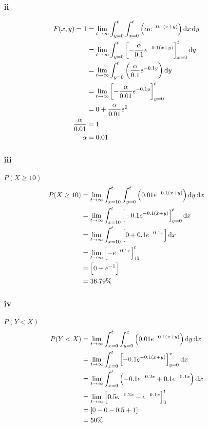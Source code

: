 \documentclass[11pt]{article}
\numberwithin{equation}{section}
\begin{document}
\subsubsection{ii}
\begin{align}
    F(x,y) = 1 &= \lim_{t\rightarrow \infty} \int_{y=0}^{t} \int_{x=0}^{t} \left(\alpha e^{-0.1\left(x+y\right)}\right) \dif x \dif y\\
    &= \lim_{t\rightarrow \infty} \int_{y=0}^{t} \left[ -\frac{\alpha}{0.1} e^{-0.1\left(x+y\right)} \right]_{x=0}^t \dif y\\
    &= \lim_{t\rightarrow \infty} \int_{y=0}^{t} \left(\frac{\alpha}{0.1} e^{-0.1y} \right) \dif y\\
    &= \lim_{t\rightarrow \infty} \left[ -\frac{\alpha}{0.01} e^{-0.1y} \right]_{y=0}^t\\
    &= 0 + \frac{\alpha}{0.01}e^{0}\\
    \frac{\alpha}{0.01} &= 1\\
    \alpha &= 0.01
\end{align}
\subsubsection{iii}
$P(X \geq 10)$
\begin{align}
    P(X \geq 10) &= \lim_{t\rightarrow \infty} \int_{x=10}^{t} \int_{y=0}^{t} \left(0.01 e^{-0.1\left(x + y\right)}\right) \dif y \dif x\\
    &= \lim_{t\rightarrow \infty} \int_{x=10}^{t} \left[-0.1 e^{-0.1\left(x + y\right)}\right]_{y=0}^t \dif x\\
    &= \lim_{t\rightarrow \infty} \int_{x=10}^{t} \left[0+0.1 e^{-0.1x}\right] \dif x\\
    &= \lim_{t\rightarrow \infty} \left[- e^{-0.1x}\right]_{10}^t\\
    &= \left[0 + e^{-1}\right]\\
    &= 36.79\%
\end{align}
\subsubsection{iv}
$P(Y < X)$
\begin{align}
    P(Y < X) &= \lim_{t\rightarrow \infty} \int_{x=0}^{t} \int_{y=0}^{x} \left(0.01 e^{-0.1\left(x + y\right)}\right) \dif y \dif x\\
    &= \lim_{t\rightarrow \infty} \int_{x=0}^{t} \left[-0.1 e^{-0.1\left(x + y\right)}\right]_{y=0}^x \dif x\\
    &= \lim_{t\rightarrow \infty} \int_{x=0}^{t} \left(-0.1e^{-0.2x}+0.1 e^{-0.1x}\right) \dif x\\
    &= \lim_{t\rightarrow \infty} \left[0.5 e^{-0.2x}- e^{-0.1x}\right]_{0}^t\\
    &= \left[0 - 0 - 0.5 + 1\right]\\
    &= 50\%
\end{align}
\end{document}
